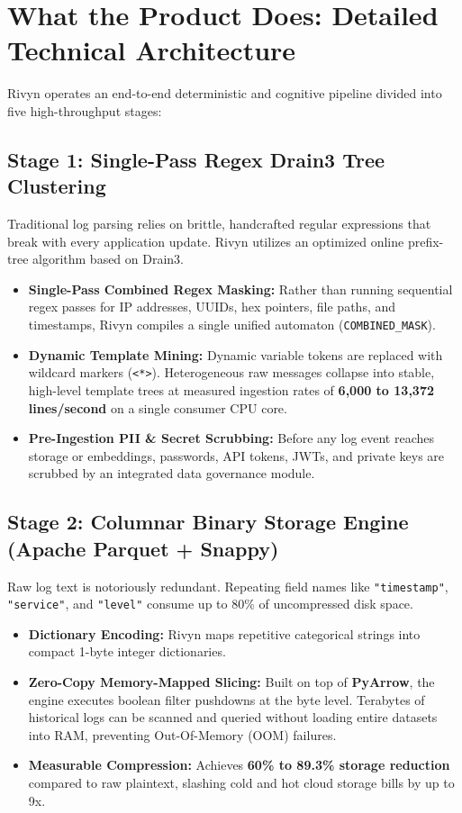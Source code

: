 \documentclass[11pt,a4paper]{article}
\begin{document}
\newpage

\section{What the Product Does: Detailed Technical Architecture}

Rivyn operates an end-to-end deterministic and cognitive pipeline divided into five high-throughput stages:

\subsection{Stage 1: Single-Pass Regex Drain3 Tree Clustering}
Traditional log parsing relies on brittle, handcrafted regular expressions that break with every application update. Rivyn utilizes an optimized online prefix-tree algorithm based on Drain3. 
\begin{itemize}[leftmargin=*]
    \item \textbf{Single-Pass Combined Regex Masking:} Rather than running sequential regex passes for IP addresses, UUIDs, hex pointers, file paths, and timestamps, Rivyn compiles a single unified automaton (\texttt{COMBINED\_MASK}).
    \item \textbf{Dynamic Template Mining:} Dynamic variable tokens are replaced with wildcard markers (\texttt{<*>}). Heterogeneous raw messages collapse into stable, high-level template trees at measured ingestion rates of \textbf{6,000 to 13,372 lines/second} on a single consumer CPU core.
    \item \textbf{Pre-Ingestion PII \& Secret Scrubbing:} Before any log event reaches storage or embeddings, passwords, API tokens, JWTs, and private keys are scrubbed by an integrated data governance module.
\end{itemize}

\subsection{Stage 2: Columnar Binary Storage Engine (Apache Parquet + Snappy)}
Raw log text is notoriously redundant. Repeating field names like \texttt{"timestamp"}, \texttt{"service"}, and \texttt{"level"} consume up to 80\% of uncompressed disk space.
\begin{itemize}[leftmargin=*]
    \item \textbf{Dictionary Encoding:} Rivyn maps repetitive categorical strings into compact 1-byte integer dictionaries.
    \item \textbf{Zero-Copy Memory-Mapped Slicing:} Built on top of \textbf{PyArrow}, the engine executes boolean filter pushdowns at the byte level. Terabytes of historical logs can be scanned and queried without loading entire datasets into RAM, preventing Out-Of-Memory (OOM) failures.
    \item \textbf{Measurable Compression:} Achieves \textbf{60\% to 89.3\% storage reduction} compared to raw plaintext, slashing cold and hot cloud storage bills by up to 9x.
\end{itemize}
\end{document}
